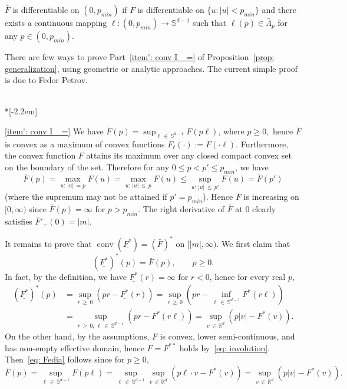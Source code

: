 \documentclass[10pt]{amsart}
\theoremstyle{definition}\newtheorem{defi}[theo]{Definition}\newtheorem{rema}[theo]{Remark}\newtheorem{exam}[theo]{Example}\newtheorem{exem}[theo]{Example}\newtheorem{nota}[theo]{Notation}
\DeclareMathOperator{\conv}{conv}
\newcommand{\ubar}[1]{\underline{#1}}
\newcommand{\Rbb}{\mathbb{R}}
\newcommand{\Sbb}{\mathbb{S}}
\begin{document}
\begin{coro} \label{cor': condition for diff}
$\bar F$ is differentiable on $(0, p_{min})$ if $F$ is differentiable on $\{u: |u|<p_{min}\}$ and there exists a continuous mapping $\ell: (0, p_{min}) \to \Sbb^{d-1}$ such that $\ell(p) \in \bar \Lambda_p$ for any $p \in (0,p_{min})$.
\end{coro}

There are few ways to prove Part~\eqref{item': conv I_ =} of Proposition~\ref{prop: generalization}, using geometric or analytic approaches. The current simple proof is due to Fedor Petrov.

\begin{proofc}\ \\*[-2.2em]

\eqref{item': conv I_ =} We have $\bar F(p) = \sup_{\ell\,\in\, \Sbb^{d-1}} F(p \ell)$, where $p \ge 0,$ hence $\bar F$ is convex as a maximum of convex functions $F_\ell(\cdot) := F(\cdot \ell)$. Furthermore, the convex function $F$ attains its maximum over any closed compact convex set on the boundary of the set. Therefore for any $0 \le p < p' \le p_{min}$, we have
\[
\bar F(p)=\max_{u:\,|u|\,=p }F(u)=\max_{u:\,|u|\,\le\,p}F(u) \le \sup_{u:\,|u|\,\le\,p'}F(u)=\bar F(p')
\]
(where the supremum may not be attained if $p'=p_{min}$). Hence $\bar F$ is increasing on $[0, \infty)$ since $\bar F(p)=\infty$ for $p> p_{min}$. The right derivative of $\bar F$ at $0$ clearly satisfies $\bar F'_+(0) = |m|$.

It remains to prove that $\conv(\ubar{F^*})= (\bar F)^*$ on $[|m|, \infty)$. We first claim that
\begin{equation}\label{eq: Fedia}
(\ubar{F^*})^*(p) = \bar F(p), \qquad p \ge 0.
\end{equation}
In fact, by the definition, we have $\ubar{F^*} (r)= \infty$ for $r <0$, hence for every real $p$,
\begin{align*}
(\ubar{F^*})^*(p) &= \sup_{r\,\ge\,0} \left(pr - \ubar{F^*}(r) \right) = \sup_{r\,\ge\,0} \left (pr - \inf_{\ell\,\in \,\Sbb^{d-1}} F^*(r \ell) \right) \\
&= \sup_{r\,\ge\,0,\,\ell\,\in\,\Sbb^{d-1}} \left(pr - F^*(r \ell) \right) = \sup_{v\,\in\,\Rbb^d} \left(p |v| - F^*(v) \right).
\end{align*}
On the other hand, by the assumptions, $F$ is convex, lower semi-continuous, and has non-empty effective domain, hence $F=F^{**}$ holds by~\eqref{eq: involution}. Then~\eqref{eq: Fedia} follows since for $p \ge 0$,
\[
\bar F(p) = \sup_{\ell\,\in\,\Sbb^{d-1}} F(p \ell) = \sup_{\ell \,\in\,\Sbb^{d-1}} \sup_{v\,\in\,\Rbb^d} \left(p \ell \cdot v -F^*(v) \right)= \sup_{v\,\in\,\Rbb^d} \left(p |v| - F^*(v) \right).
\]


\end{proofc}
\end{document}
